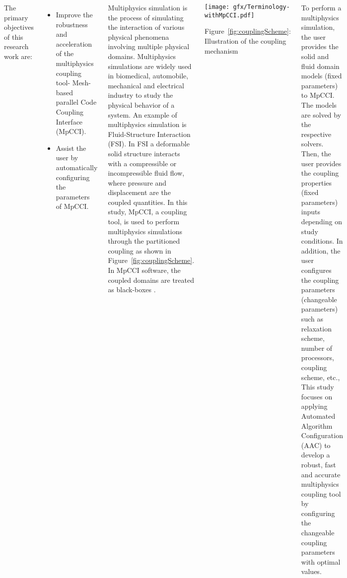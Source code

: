 \documentclass[20pt, 
               a4paper, 
               portraitmargin = 0mm, 
               margin = 0mm,
               innermargin = 50mm,
               blockverticalspace = 10mm,
               colspace = 40mm,
               subcolspace = 8mm]
               {tikzposter}
\begin{document}
\begin{columns}
    {
    The primary objectives of this research work are:
    \begin{itemize}
        \item Improve the robustness and acceleration of the multiphysics coupling tool- Mesh-based parallel Code Coupling Interface (MpCCI).
        \item Assist the user by automatically configuring the parameters of MpCCI.
        
    \end{itemize}
    }
    {
    Multiphysics simulation is the process of simulating the interaction of various physical phenomena involving multiple physical domains. Multiphysics simulations are widely used in biomedical, automobile, mechanical and electrical industry to study the physical behavior of a system. An example of multiphysics simulation is Fluid-Structure Interaction (FSI). In FSI a deformable solid structure interacts with 
    a compressible or incompressible fluid flow, where pressure and displacement are the coupled quantities. In this study, MpCCI, a coupling tool, is used to perform multiphysics simulations through the partitioned coupling as shown in Figure~\ref{fig:couplingScheme}. In MpCCI software, the coupled domains are treated as black-boxes \cite{MpCCI_documentation}.
    
    \begin{tikzfigure}
			\texttt{[image: gfx/Terminology-withMpCCI.pdf]}
			\label{fig:couplingScheme}
			\caption{Figure~\ref{fig:couplingScheme}: Illustration of the coupling mechanism}
	\end{tikzfigure}
    
    To perform a multiphysics simulation, the user provides the solid and fluid domain models (fixed parameters) to MpCCI. The models are solved by the respective solvers. Then, the user provides the coupling properties (fixed parameters) inputs depending on study conditions. In addition, the user configures the coupling parameters (changeable parameters) such as relaxation scheme, number of processors, coupling scheme, etc., This study focuses on applying Automated Algorithm Configuration (AAC) to develop a robust, fast and accurate multiphysics coupling tool by configuring the changeable coupling parameters with optimal values.
    }
    		

\end{columns}
\end{document}
